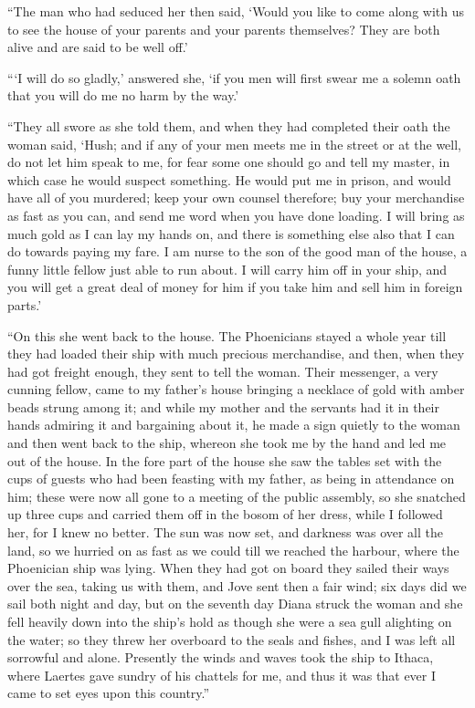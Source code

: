 “The man who had seduced her then said, ‘Would you like to come along with us
to see the house of your parents and your parents themselves? They are both
alive and are said to be well off.’

“‘I will do so gladly,’ answered she, ‘if you men will first swear me a solemn
oath that you will do me no harm by the way.’

“They all swore as she told them, and when they had completed their oath the
woman said, ‘Hush; and if any of your men meets me in the street or at the
well, do not let him speak to me, for fear some one should go and tell my
master, in which case he would suspect something. He would put me in prison,
and would have all of you murdered; keep your own counsel therefore; buy your
merchandise as fast as you can, and send me word when you have done loading. I
will bring as much gold as I can lay my hands on, and there is something else
also that I can do towards paying my fare. I am nurse to the son of the good
man of the house, a funny little fellow just able to run about. I will carry
him off in your ship, and you will get a great deal of money for him if you
take him and sell him in foreign parts.’

“On this she went back to the house. The Phoenicians stayed a whole year till
they had loaded their ship with much precious merchandise, and then, when they
had got freight enough, they sent to tell the woman. Their messenger, a very
cunning fellow, came to my father’s house bringing a necklace of gold with
amber beads strung among it; and while my mother and the servants had it in
their hands admiring it and bargaining about it, he made a sign quietly to the
woman and then went back to the ship, whereon she took me by the hand and led
me out of the house. In the fore part of the house she saw the tables set with
the cups of guests who had been feasting with my father, as being in attendance
on him; these were now all gone to a meeting of the public assembly, so she
snatched up three cups and carried them off in the bosom of her dress, while I
followed her, for I knew no better. The sun was now set, and darkness was over
all the land, so we hurried on as fast as we could till we reached the harbour,
where the Phoenician ship was lying. When they had got on board they sailed
their ways over the sea, taking us with them, and Jove sent then a fair wind;
six days did we sail both night and day, but on the seventh day Diana struck
the woman and she fell heavily down into the ship’s hold as though she were a
sea gull alighting on the water; so they threw her overboard to the seals and
fishes, and I was left all sorrowful and alone. Presently the winds and waves
took the ship to Ithaca, where Laertes gave sundry of his chattels for me, and
thus it was that ever I came to set eyes upon this country.”

